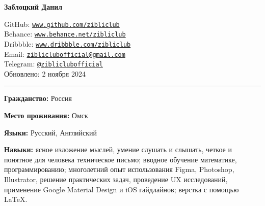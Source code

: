 \documentclass[10pt, a4paper]{article}
\newcommand{\heading}[1]{
    \makebox[0pt][l]{\Large \sc \hspace{2pt}#1}
    \rule[-0.7ex]{\columnwidth}{0.5pt}\vspace{1.0ex}
    }
\newcommand{\generalInfoSkip}{\vspace{0.8ex}}
\newenvironment{mysection}[1]
    {\vspace{3.5ex}
    \heading{#1}
    \begin{adjustwidth}{0.3cm}{0cm}}
    {\end{adjustwidth} }
\begin{document}
\textbf{\textcolor{CtpMauve}{\LARGE Заблоцкий Данил}}

\vspace{1.5ex}
GitHub: \href{https://github.com/zibliclub}{\textcolor{CtpBlue}{\texttt{www.github.com/zibliclub}}}\\
Behance: \href{https://www.behance.net/zibliclubo9570}{\textcolor{CtpBlue}{\texttt{www.behance.net/zibliclub}}}\\
Dribbble: \href{https://dribbble.com/zibliclub}{\textcolor{CtpBlue}{\texttt{www.dribbble.com/zibliclub}}}\\
Email: \href{mailto:zibliclubofficial@gmail.com}{\textcolor{CtpBlue}{\texttt{zibliclubofficial@gmail.com}}}\\
Telegram: \href{https://t.me/zibliclubofficial}{\textcolor{CtpBlue}{\texttt{@zibliclubofficial}}}\\
Обновлено: 2 ноября 2024 \\

\begin{mysection}{\textcolor{CtpSky}{Основная информация}}
	\textbf{Гражданство:} Россия

	\generalInfoSkip
	\textbf{Место проживания:} Омск

	\generalInfoSkip
	\textbf{Языки:} Русский, Английский

	\generalInfoSkip
	\textbf{Навыки:} ясное изложение мыслей, умение слушать и слышать, четкое и понятное для человека техническое письмо;
	вводное обучение математике, программированию;
	многолетний опыт использования Figma, Photoshop, Illustrator, решение практических задач, проведение UX исследований, применение Google Material Design и iOS гайдлайнов;
	верстка с помощью LaTeX.
\end{mysection}
\end{document}
